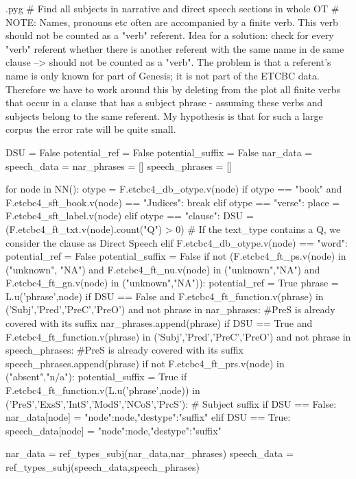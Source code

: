 \documentclass{report}
\makeatletter
\newenvironment{python}{%
  \VerbatimEnvironment
  \minted@resetoptions
  \setkeys{minted@opt}{}
      \begin{VerbatimOut}{\jobname.pyg}}
{%
      \end{VerbatimOut}
      \minted@pygmentize{python}
      \DeleteFile{\jobname.pyg}}
\makeatother
\begin{document}
\begin{python}
# Find all subjects in narrative and direct speech sections in whole OT 
# NOTE: Names, pronouns etc often are accompanied by a finite verb. This verb should not be counted as a "verb" referent. Idea for a solution: check for every "verb" referent whether there is another referent with the same name in de same clause --> should not be counted as a "verb". The problem is that a referent's name is only known for part of Genesis; it is not part of the ETCBC data. Therefore we have to work around this by deleting from the plot all finite verbs that occur in a clause that has a subject phrase - assuming these verbs and subjects belong to the same referent. My hypothesis is that for such a large corpus the error rate will be quite small.

DSU = False
potential_ref = False
potential_suffix = False
nar_data = {}
speech_data = {}
nar_phrases = []
speech_phrases = []

for node in NN():
    otype = F.etcbc4_db_otype.v(node)
    if otype == "book" and F.etcbc4_sft_book.v(node) == "Judices":
        break
    elif otype == "verse":
        place = F.etcbc4_sft_label.v(node)
    elif otype == "clause":
        DSU = (F.etcbc4_ft_txt.v(node).count("Q") > 0)    # If the text_type contains a Q, we consider the clause as Direct Speech
    elif F.etcbc4_db_otype.v(node) == "word":
        potential_ref = False
        potential_suffix = False
        if not (F.etcbc4_ft_ps.v(node) in ("unknown", "NA") and F.etcbc4_ft_nu.v(node) in ("unknown","NA") and F.etcbc4_ft_gn.v(node) in ("unknown","NA")):
            potential_ref = True
            phrase = L.u('phrase',node)
            if DSU == False and F.etcbc4_ft_function.v(phrase) in ('Subj','Pred','PreC','PreO') and not phrase in nar_phrases: #PreS is already covered with its suffix
                nar_phrases.append(phrase)
            if DSU == True and F.etcbc4_ft_function.v(phrase) in ('Subj','Pred','PreC','PreO') and not phrase in speech_phrases: #PreS is already covered with its suffix
                speech_phrases.append(phrase) 
        if not F.etcbc4_ft_prs.v(node) in ("absent","n/a"):
            potential_suffix = True
            if F.etcbc4_ft_function.v(L.u('phrase',node)) in ('PreS','ExsS','IntS','ModS','NCoS','PrcS'): # Subject suffix
                if DSU == False:
                    nar_data[node] = {"node":node,"destype":"suffix"}
                elif DSU == True:
                    speech_data[node] = {"node":node,"destype":"suffix"}

nar_data = ref_types_subj(nar_data,nar_phrases)
speech_data = ref_types_subj(speech_data,speech_phrases)

\end{python}
\end{document}
